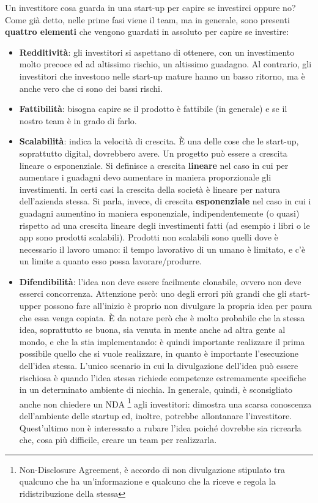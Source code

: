 Un investitore cosa guarda in una start-up per capire se investirci oppure no?
Come già detto, nelle prime fasi viene il team, ma in generale, sono presenti
\textbf{quattro elementi} che vengono guardati in assoluto per capire se
investire:
\begin{itemize}
 \item \textbf{Redditività}: gli investitori si aspettano di ottenere, con un
 investimento molto precoce ed ad altissimo rischio, un altissimo guadagno. Al
 contrario, gli investitori che investono nelle start-up mature hanno un basso
 ritorno, ma è anche vero che ci sono dei bassi rischi.
 \item \textbf{Fattibilità}: bisogna capire se il prodotto è fattibile (in
 generale) e se il nostro team è in grado di farlo.
 \item \textbf{Scalabilità}: indica la velocità di crescita. È una delle cose
 che le start-up, soprattutto digital, dovrebbero avere. Un progetto può essere
 a crescita lineare o esponenziale. Si definisce a crescita \textbf{lineare}
 nel caso in cui per aumentare i guadagni devo aumentare in maniera
 proporzionale gli investimenti. In certi casi la crescita della società è
 lineare per natura dell'azienda stessa. Si parla, invece, di crescita
 \textbf{esponenziale} nel caso in cui i guadagni aumentino in maniera
 esponenziale, indipendentemente (o quasi) rispetto ad una crescita lineare
 degli investimenti fatti (ad esempio i libri o le app sono prodotti scalabili).
 Prodotti non scalabili sono quelli dove è necessario il lavoro umano: il tempo
 lavorativo di un umano è limitato, e c'è un limite a quanto esso possa
 lavorare/produrre.
 \item \textbf{Difendibilità}: l'idea non deve essere facilmente clonabile,
 ovvero non deve esserci concorrenza. Attenzione però: uno degli errori più
 grandi che gli start-upper possono fare all'inizio è proprio non divulgare la
 propria idea per paura che essa venga copiata. È da notare però che è molto
 probabile che la stessa idea, soprattutto se buona, sia venuta in mente anche
 ad altra gente al mondo, e che la stia implementando: è quindi importante
 realizzare il prima possibile quello che si vuole realizzare, in quanto è
 importante l'esecuzione dell'idea stessa. L'unico scenario in cui la
 divulgazione dell'idea può essere rischiosa è quando l'idea stessa richiede
 competenze estremamente specifiche in un determinato ambiente di nicchia. In
 generale, quindi, è sconsigliato anche non chiedere un
 NDA \footnote{Non-Disclosure Agreement, è accordo di non divulgazione stipulato
 tra qualcuno che ha un'informazione e qualcuno che la riceve e regola la
 ridistribuzione della stessa} agli investitori: dimostra una scarsa conoscenza
 dell'ambiente delle startup ed, inoltre, potrebbe allontanare l'investitore.
 Quest'ultimo non è interessato a rubare l'idea poiché dovrebbe sia ricrearla
 che, cosa più difficile, creare un team per realizzarla.


\end{itemize}
